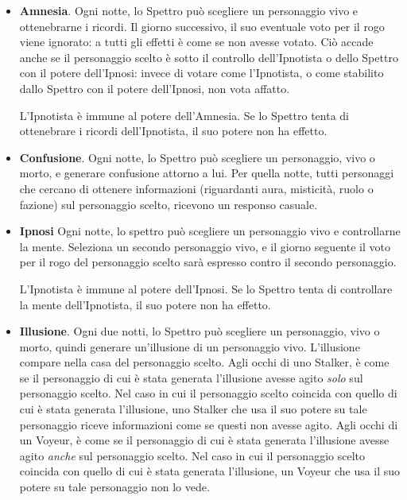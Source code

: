 \documentclass[a4paper,10pt]{article}
\begin{document}
\begin{itemize}
 \item {\bf Amnesia}. Ogni notte, lo Spettro può scegliere un personaggio vivo e ottenebrarne i ricordi. Il giorno successivo, il suo eventuale voto per il rogo viene ignorato: a tutti gli effetti è come se non avesse votato. Ciò accade anche se il personaggio scelto è sotto il controllo dell'Ipnotista o dello Spettro con il potere dell'Ipnosi: invece di votare come l'Ipnotista, o come stabilito dallo Spettro con il potere dell'Ipnosi, non vota affatto.
 
 L'Ipnotista è immune al potere dell'Amnesia. Se lo Spettro tenta di ottenebrare i ricordi dell'Ipnotista, il suo potere non ha effetto.
 
 
 \item {\bf Confusione}. Ogni notte, lo Spettro può scegliere un personaggio, vivo o morto, e generare confusione attorno a lui.
 Per quella notte, tutti personaggi che cercano di ottenere informazioni (riguardanti aura, misticità, ruolo o fazione) sul personaggio scelto, ricevono un responso casuale.
 
 \item{\bf Ipnosi} Ogni notte, lo spettro può scegliere un personaggio vivo e controllarne la mente. Seleziona un secondo personaggio vivo, e il giorno seguente il voto per il rogo del personaggio scelto sarà espresso contro il secondo personaggio.

 L'Ipnotista è immune al potere dell'Ipnosi. Se lo Spettro tenta di controllare la mente dell'Ipnotista, il suo potere non ha effetto.


 \item {\bf Illusione}. Ogni due notti, lo Spettro può scegliere un personaggio, vivo o morto, quindi generare un'illusione di un personaggio vivo. L'illusione compare nella casa del personaggio scelto.
 Agli occhi di uno Stalker, è come se il personaggio di cui è stata generata l'illusione avesse agito \emph{solo} sul personaggio scelto. Nel caso in cui il personaggio scelto coincida con quello di cui è stata generata l'illusione, uno Stalker che usa il suo potere su tale personaggio riceve informazioni come se questi non avesse agito.
 Agli occhi di un Voyeur, è come se il personaggio di cui è stata generata l'illusione avesse agito \emph{anche} sul personaggio scelto. Nel caso in cui il personaggio scelto coincida con quello di cui è stata generata l'illusione, un Voyeur che usa il suo potere su tale personaggio non lo vede.


\end{itemize}
\end{document}
